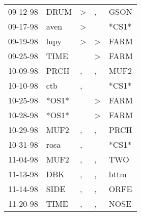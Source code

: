\begin{supertabular}{p{0.07\textwidth}p{0.06\textwidth}p{0.02\textwidth}p{0.02\textwidth}p{0.06\textwidth}}
          09-12-98\textsuperscript{} &           DRUM\textsuperscript{} &     \textgreater &                , &           GSON\textsuperscript{} \\
          09-17-98\textsuperscript{} &           aven\textsuperscript{} &     \textgreater &                  &                            *CS1* \\
          09-19-98\textsuperscript{} &           lupy\textsuperscript{} &     \textgreater &     \textgreater &           FARM\textsuperscript{} \\
          09-25-98\textsuperscript{} &           TIME\textsuperscript{} &                  &     \textgreater &           FARM\textsuperscript{} \\
          10-09-98\textsuperscript{} &           PRCH\textsuperscript{} &                , &                , &           MUF2\textsuperscript{} \\
          10-10-98\textsuperscript{} &            ctb\textsuperscript{} &                , &                  &                            *CS1* \\
          10-25-98\textsuperscript{} &                            *OS1* &                  &     \textgreater &           FARM\textsuperscript{} \\
          10-28-98\textsuperscript{} &                            *OS1* &                  &     \textgreater &           FARM\textsuperscript{} \\
          10-29-98\textsuperscript{} &           MUF2\textsuperscript{} &                , &                , &           PRCH\textsuperscript{} \\
          10-31-98\textsuperscript{} &           rosa\textsuperscript{} &                , &                  &                            *CS1* \\
          11-04-98\textsuperscript{} &           MUF2\textsuperscript{} &                , &                , &            TWO\textsuperscript{} \\
          11-13-98\textsuperscript{} &            DBK\textsuperscript{} &                , &                , &           bttm\textsuperscript{} \\
          11-14-98\textsuperscript{} &           SIDE\textsuperscript{} &                , &                , &           ORFE\textsuperscript{} \\
          11-20-98\textsuperscript{} &           TIME\textsuperscript{} &                , &                , &           NOSE\textsuperscript{} \\

\end{supertabular}
